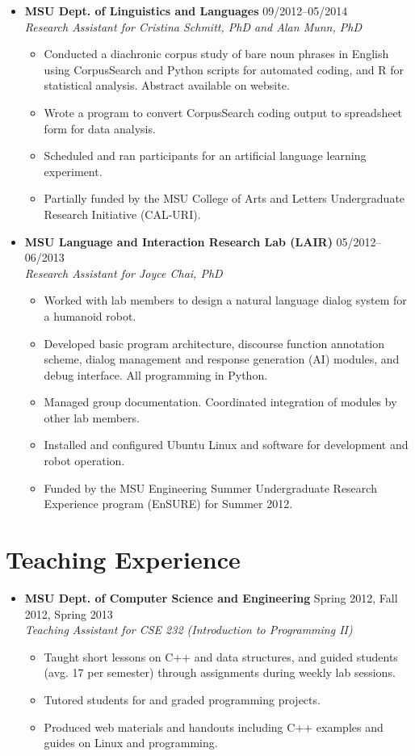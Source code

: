 \documentclass[10pt,oneside]{article}
\newcommand{\ressection}[1]{
	\vspace{-12pt}
	\section*{#1}
}
\newcommand{\resbigitem}[4]{
	\item
	\textbf{#1} \hfill #2 \\
	\textit{#3} \hfill \textit{#4}
}
\begin{document}
\begin{itemize}
	\resbigitem
		{MSU Dept. of Linguistics and Languages}
		{09/2012--05/2014}
		{Research Assistant for Cristina Schmitt, PhD and Alan Munn, PhD}
		{}
	\begin{itemize}
		\item{Conducted a diachronic corpus study of bare noun phrases in English using CorpusSearch and Python scripts for automated coding, and R for statistical analysis. Abstract available on website.}
		\item{Wrote a program to convert CorpusSearch coding output to spreadsheet form for data analysis.}
		\item{Scheduled and ran participants for an artificial language learning experiment.}
		\item{Partially funded by the MSU College of Arts and Letters Undergraduate Research Initiative (CAL-URI).}
	\end{itemize}
	
	\resbigitem
		{MSU Language and Interaction Research Lab (LAIR)}
		{05/2012--06/2013}
		{Research Assistant for Joyce Chai, PhD}
		{}
	\begin{itemize}
		\item{Worked with lab members to design a natural language dialog system for a humanoid robot.}
		\item{Developed basic program architecture, discourse function annotation scheme, dialog management and response generation (AI) modules, and debug interface. All programming in Python.}
		\item{Managed group documentation. Coordinated integration of modules by other lab members.}
		\item{Installed and configured Ubuntu Linux and software for development and robot operation.}
		\item{Funded by the MSU Engineering Summer Undergraduate Research Experience program (EnSURE) for Summer 2012.}
		
	\end{itemize}
\end{itemize}


\ressection{Teaching Experience}

\begin{itemize}
	\resbigitem
		{MSU Dept. of Computer Science and Engineering}
		{Spring 2012, Fall 2012, Spring 2013}
		{Teaching Assistant for CSE 232 (Introduction to Programming II)}
		{}
	\begin{itemize}
		\item{Taught short lessons on C++ and data structures, and guided students (avg. 17 per semester) through assignments during weekly lab sessions.}
		\item{Tutored students for and graded programming projects.}
		\item{Produced web materials and handouts including C++ examples and guides on Linux and programming.}
	\end{itemize}
\end{itemize}
\end{document}
